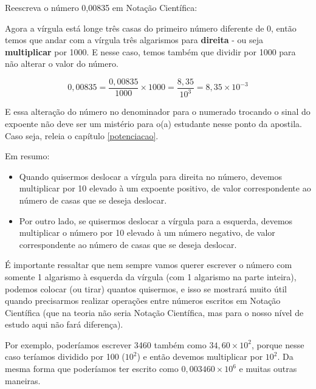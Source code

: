 \begin{exemplo}
    Reescreva o número 0,00835 em Notação Científica:

    \vspace{0.5cm}

    Agora a vírgula está longe três casas do primeiro número diferente de 0, então temos que andar com a vírgula três algarismos para \textbf{direita} - ou seja \textbf{multiplicar} por 1000. E nesse caso, temos também que dividir por 1000 para não alterar o valor do número.

    \begin{equation}
        0,00835=\frac{0,00835}{1000}\times1000=\frac{8,35}{10^3}=8,35\times10^{-3}
    \end{equation}

    E essa alteração do número no denominador para o numerado trocando o sinal do expoente não deve ser um mistério para o(a) estudante nesse ponto da apostila. Caso seja, releia o capítulo \ref{potenciacao}.
\end{exemplo}

Em resumo:

\begin{itemize}
    \item Quando quisermos deslocar a vírgula para direita no número, devemos multiplicar por 10 elevado à um expoente positivo, de valor correspondente ao número de casas que se deseja deslocar.
    \item Por outro lado, se quisermos deslocar a vírgula para a esquerda, devemos multiplicar o número por 10 elevado à um número negativo, de valor correspondente ao número de casas que se deseja deslocar.
\end{itemize} 

\begin{tcolorbox}[title=IMPORTANTE]
    É importante ressaltar que nem sempre vamos querer escrever o número com somente 1 algarismo à esquerda da vírgula (com 1 algarismo na parte inteira), podemos colocar (ou tirar) quantos quisermos, e isso se mostrará muito útil quando precisarmos realizar operações entre números escritos em Notação Científica (que na teoria não seria Notação Científica, mas para o nosso nível de estudo aqui não fará diferença).
\end{tcolorbox}

Por exemplo, poderíamos escrever 3460 também como \(34,60\times10^2\), porque nesse caso teríamos dividido por 100 (\(10^2\)) e então devemos multiplicar por \(10^2\). Da mesma forma que poderíamos ter escrito como \(0,003460\times10^6\) e muitas outras maneiras. 

